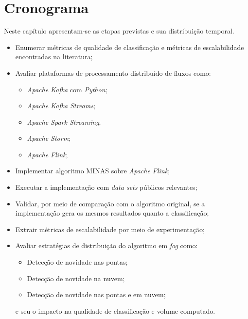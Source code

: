 \chapter{Cronograma}
\label{cha:crono}


Neste capítulo apresentam-se as etapas previstas e sua distribuição temporal.

\begin{itemize}
  \item Enumerar métricas de qualidade de classificação e métricas de
    escalabilidade encontradas na literatura;
  \item Avaliar plataformas de processamento distribuído de fluxos como:
    \begin{itemize}
        \item \emph{Apache Kafka} com \emph{Python};
        \item \emph{Apache Kafka Streams};
        \item \emph{Apache Spark Streaming};
        \item \emph{Apache Storm};
        \item \emph{Apache Flink};
    \end{itemize}
  \item Implementar algoritmo MINAS sobre \emph{Apache Flink};
  \item Executar a implementação com \emph{data sets} públicos relevantes;
  \item Validar, por meio de comparação com o algoritmo original, se a
    implementação gera os mesmos resultados quanto a classificação;
  \item Extrair métricas de escalabilidade por meio de experimentação;
  \item Avaliar estratégias de distribuição do algoritmo em \emph{fog} como:
  \begin{itemize}
    \item Detecção de novidade nas pontas;
    \item Detecção de novidade na nuvem;
    \item Detecção de novidade nas pontas e em nuvem;
  \end{itemize}
    e seu o impacto na qualidade de classificação e volume computado.
\end{itemize}

